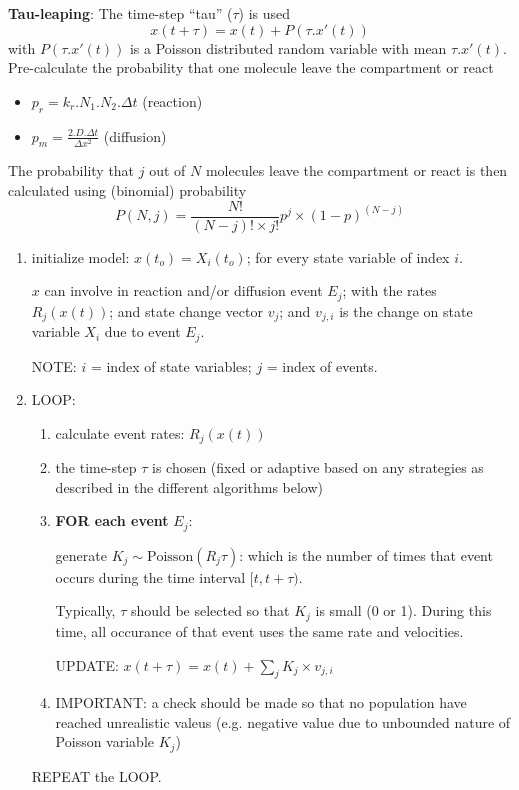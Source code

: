 {\bf Tau-leaping}: The time-step ``tau'' ($\tau$) is used
\begin{equation}
x(t+\tau) = x(t) + P(\tau . x'(t))
\end{equation}
with $P(\tau. x'(t))$ is a Poisson distributed random variable with mean
$\tau.x'(t)$.
Pre-calculate the probability that one molecule leave the compartment or react
\begin{itemize}
  \item $p_r = k_r . N_1 . N_2 .\Delta t$ (reaction)
  
  \item $p_m = \frac{2.D.\Delta t}{\Delta x^2}$ (diffusion)
\end{itemize}
The probability that $j$ out of $N$ molecules leave the compartment or react  
is then calculated using (binomial) probability
\begin{equation}
P(N,j) = \frac{N!}{(N-j)! \times j!} p^j \times (1-p)^{(N-j)}
\end{equation}


\begin{enumerate}
  \item initialize model: $x(t_o) = {X_i(t_o)}$; for every state variable of
  index $i$.
    
  $x$ can involve in reaction and/or diffusion event $E_j$; with the rates
  $R_j(x(t))$; and state change vector $v_j$; and $v_{j,i}$ is the change on
  state variable $X_i$ due to event $E_j$.
   
   
  NOTE: $i$ = index of state variables; $j$ = index of events.
  
  \item LOOP: 
  \begin{enumerate}
    \item calculate event rates: $R_j(x(t))$
  
  \item the time-step $\tau$ is chosen (fixed or adaptive based on any
  strategies as described in the different algorithms below)
  
  \item {\bf FOR each event} $E_j$: 
  
  generate $K_j \sim \text{Poisson}(R_j \tau)$: which is the number of times
  that event occurs during the time interval $[t, t+\tau)$.
  
  Typically, $\tau$ should be selected so that $K_j$ is small (0 or 1). During
  this time, all occurance of that event uses the same rate and velocities.
  
  UPDATE: $x(t+\tau) = x(t) + \sum_j K_j \times v_{j,i}$
  
  \item IMPORTANT: a check should be made so that no population have reached
  unrealistic valeus (e.g. negative value due to unbounded nature of Poisson
  variable $K_j$)
  
  
  \end{enumerate}
  REPEAT the LOOP.
\end{enumerate}


